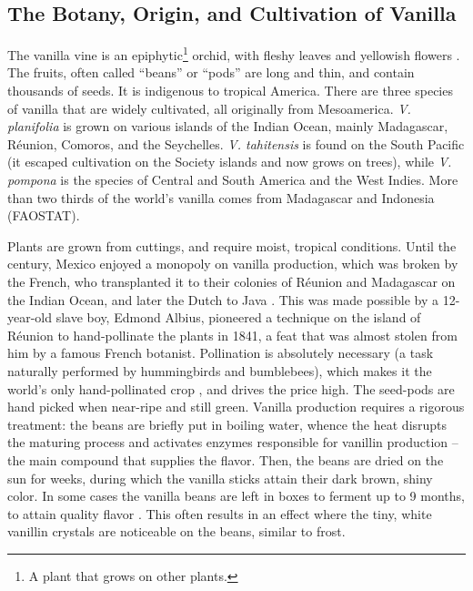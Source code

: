\subsection{The Botany, Origin, and Cultivation of Vanilla }

The vanilla vine is an epiphytic\footnote{A plant that grows on other plants.} orchid,  with fleshy leaves and yellowish flowers \parencite[282]{van_wyk_culinary_2014}. 
The fruits, often called ``beans'' or ``pods'' are long and thin, and contain thousands of seeds. It is indigenous to tropical America. There are three species of vanilla that are widely cultivated, all  originally from Mesoamerica. \textit{V. planifolia} is grown on various islands of the Indian Ocean, mainly Madagascar, Réunion, Comoros, and the Seychelles. \textit{V. tahitensis} is found on the South Pacific (it escaped cultivation on the Society islands and now grows on trees), while \textit{V. pompona} is the species of Central and South America and the West Indies. More than two thirds of the world's vanilla comes from Madagascar and Indonesia (FAOSTAT).

Plants are grown from cuttings, and require moist, tropical conditions. Until the  century, Mexico enjoyed a monopoly on vanilla production, which was broken by the French, who transplanted it to their colonies of Réunion and Madagascar on the Indian Ocean, and later the Dutch to Java \parencite[282]{van_wyk_culinary_2014}.
This was made possible by a 12-year-old slave boy, Edmond Albius, pioneered a technique on the island of Réunion to hand-pollinate the plants in 1841, a feat that was almost stolen from him by a famous French botanist. Pollination is absolutely necessary (a task naturally performed by hummingbirds and bumblebees), which makes it the world's only hand-pollinated crop \parencite[959]{mabberley_mabberleys_2017}, and drives the price high. The seed-pods are hand picked when near-ripe and still green. Vanilla production requires a rigorous treatment: the beans are briefly put in boiling water, whence the heat disrupts the maturing process and activates enzymes responsible for vanillin production -- the main compound that supplies the flavor. Then, the beans are dried on the sun for weeks, during which the vanilla sticks attain their dark brown, shiny color. In some cases the vanilla beans are left in boxes to ferment up to 9 months, to attain quality flavor \parencite[282]{van_wyk_culinary_2014}. This often results in an effect where the tiny, white vanillin crystals are noticeable on the beans, similar to frost.



